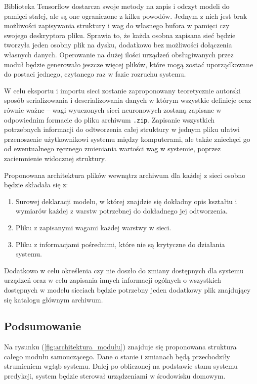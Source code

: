 Biblioteka Tensorflow dostarcza swoje metody na zapis i odczyt modeli do pamięci stałej, ale są one ograniczone z kilku powodów. Jednym z nich jest brak możliwości zapisywania struktury i wag do własnego bufora w pamięci czy swojego deskryptora pliku. Sprawia to, że każda osobna zapisana sieć będzie tworzyła jeden osobny plik na dysku, dodatkowo bez możliwości dołączenia własnych danych. Operowanie na dużej ilości urządzeń obsługiwanych przez moduł będzie generowało jeszcze więcej plików, które mogą zostać uporządkowane do postaci jednego, czytanego raz w fazie rozruchu systemu.

W celu eksportu i importu sieci zostanie zaproponowany teoretycznie autorski sposób serializowania i deserializowania danych \cite{book:serialization_deserialization} w którym wszystkie definicje oraz równie ważne -- wagi wyuczonych sieci neuronowych zostaną zapisane w odpowiednim formacie do pliku archiwum \verb+.zip+. Zapisanie wszystkich potrzebnych informacji do odtworzenia całej struktury w jednym pliku ułatwi przenoszenie użytkownikowi systemu między komputerami, ale także zniechęci go od ewentualnego ręcznego zmieniania wartości wag w systemie, poprzez zaciemnienie widocznej struktury.

Proponowana architektura plików wewnątrz archiwum dla każdej z sieci osobno będzie składała się z:
\begin{enumerate}
    \item Surowej deklaracji modelu, w której znajdzie się dokładny opis kształtu i wymiarów każdej z warstw potrzebnej do dokładnego jej odtworzenia.
    \item Pliku z zapisanymi wagami każdej warstwy w sieci.
    \item Pliku z informacjami pośrednimi, które nie są krytyczne do działania systemu.
\end{enumerate}

Dodatkowo w celu określenia czy nie doszło do zmiany dostępnych dla systemu urządzeń oraz w celu zapisania innych informacji ogólnych o wszystkich dostępnych w modelu sieciach będzie potrzebny jeden dodatkowy plik znajdujący się katalogu głównym archiwum.

\subsection{Podsumowanie}
Na rysunku (\ref{fig:architektura_modułu}) znajduje się proponowana struktura całego modułu samouczącego. Dane o stanie i zmianach będą przechodziły strumieniem wgłąb systemu. Dalej po obliczonej na podstawie stanu systemu predykcji, system będzie sterował urządzeniami w środowisku domowym.


